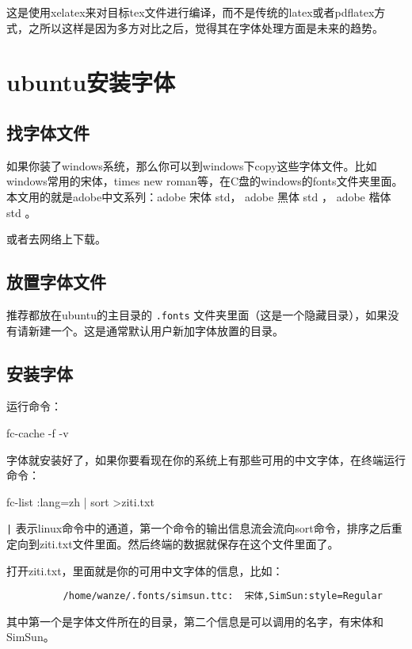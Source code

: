 \documentclass[11pt,oneside]{book}
\begin{document}
        这是使用xelatex来对目标tex文件进行编译，而不是传统的latex或者pdflatex方式，之所以这样是因为多方对比之后，觉得其在字体处理方面是未来的趋势。


        \section{ubuntu安装字体}
        \subsection{找字体文件}
        如果你装了windows系统，那么你可以到windows下copy这些字体文件。比如windows常用的宋体，times new roman等，在C盘的windows的fonts文件夹里面。本文用的就是adobe中文系列：adobe 宋体 std， adobe 黑体 std ， adobe 楷体 std 。

        或者去网络上下载。

        \subsection{放置字体文件}

        推荐都放在ubuntu的主目录的 \verb+.fonts+ 文件夹里面（这是一个隐藏目录），如果没有请新建一个。这是通常默认用户新加字体放置的目录。

        \subsection{安装字体}

        运行命令：
        \begin{tcbbash}
          fc-cache -f  -v
        \end{tcbbash}


        字体就安装好了，如果你要看现在你的系统上有那些可用的中文字体，在终端运行命令：
        \begin{tcbbash}
          fc-list :lang=zh | sort >ziti.txt
        \end{tcbbash}

        \verb+|+ 表示linux命令中的通道，第一个命令的输出信息流会流向sort命令，排序之后重定向到ziti.txt文件里面。然后终端的数据就保存在这个文件里面了。

        打开ziti.txt，里面就是你的可用中文字体的信息，比如：
        \begin{Verbatim}
          /home/wanze/.fonts/simsun.ttc:  宋体,SimSun:style=Regular
        \end{Verbatim}

        其中第一个是字体文件所在的目录，第二个信息是可以调用的名字，有宋体和SimSun。
\end{document}
